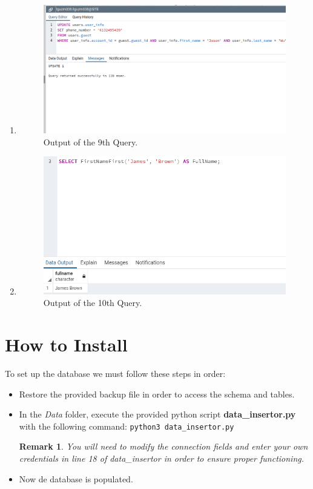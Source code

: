 \documentclass[12pt, lettersize]{article}
\theoremstyle{Remark}
\newtheorem*{remark}{Remark}
\begin{document}
\begin{enumerate}
		\item 
		
		
		\begin{figure}[h]
			\centering
			\includegraphics[width= 0.6\linewidth]{Query9Output.png}
			\caption{Output of the 9th Query.}
		\end{figure}
		
		\item 
		
		
		\begin{figure}[h]
			\centering
			\includegraphics[width= 0.6\linewidth]{Query10Output.png}
			\caption{Output of the 10th Query.}
		\end{figure}
		
	\end{enumerate}
	

	
		
	\section{How to Install}
	
	To set up the database we must follow these steps in order:
	
	\begin{itemize}
		\item Restore the provided backup file in order to access the schema and tables.
		
		\item In the \textsl{Data} folder, execute the provided python script \textbf{data\_insertor.py} with the following command: \texttt{python3 data\_insertor.py}
		
		\begin{remark}
			You will need to modify the connection fields and enter your own credentials in line 18 of data\_insertor in order to ensure proper functioning. 
		\end{remark} 
		
		\item Now de database is populated.
		
	\end{itemize}	
	
\end{document}
